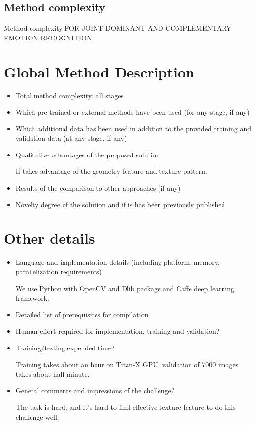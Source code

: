 \documentclass{article}
\begin{document}
\subsection{Method complexity}
Method complexity FOR JOINT DOMINANT AND COMPLEMENTARY EMOTION RECOGNITION


\section{Global Method Description}

\begin{itemize}
\item Total method complexity: all stages
\item Which pre-trained or external methods have been used (for any stage, if any)
\item Which additional data has been used in addition to the provided training and validation data (at any stage, if any)
\item Qualitative advantages of the proposed solution

If takes advantage of the geometry feature and texture pattern.
\item Results of the comparison to other approaches (if any)
\item Novelty degree of the solution and if is has been previously published
\end{itemize}

\section{Other details}

\begin{itemize}
\item Language and implementation details (including platform, memory, parallelization requirements)

We use Python with OpenCV and Dlib package and Caffe deep learning framework.
\item Detailed list of prerequisites for compilation
\item Human effort required for implementation, training and validation?
\item Training/testing expended time?

Training takes about an hour on Titan-X GPU, validation of 7000 images takes about half minute.
\item General comments and impressions of the challenge?

The task is hard, and it's hard to find effective texture feature to do this challenge well.

\end{itemize}
\end{document}
